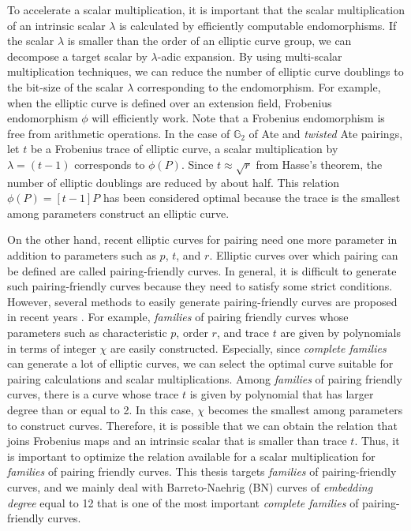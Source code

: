 To accelerate a scalar multiplication, it is important that the scalar multiplication of an intrinsic scalar $\lambda$ is calculated by efficiently computable endomorphisms.
If the scalar $\lambda$ is smaller than the order of an elliptic curve group, we can decompose a target scalar by $\lambda$-adic expansion.
By using multi-scalar multiplication techniques, we can reduce the number of elliptic curve doublings to the bit-size of the scalar $\lambda$ corresponding to the endomorphism.
For example, when the elliptic curve is defined over an extension field, Frobenius endomorphism $\phi$ will efficiently work.
Note that a Frobenius endomorphism is free from arithmetic operations.
In the case of $\mathbb{G}_2$ of Ate and {\it twisted} Ate pairings, let $t$ be a Frobenius trace of elliptic curve, a scalar multiplication by $\lambda = (t-1)$ corresponds to $\phi(P)$.
Since $t\approx\sqrt{r}$ from Hasse's theorem, the number of elliptic doublings are reduced by about half.
This relation $\phi(P)=[t-1]P$ has been considered optimal because the trace is the smallest among parameters construct an elliptic curve. 

On the other hand, recent elliptic curves for pairing need one more parameter in addition to parameters such as $p$, $t$, and $r$.  
Elliptic curves over which pairing can be defined are called pairing-friendly curves.
In general, it is difficult to generate such pairing-friendly curves because they need to satisfy some strict conditions.
However, several methods to easily generate pairing-friendly curves are proposed in recent years \cite{JC:FreScoTes10}.
For example, {\it families} of pairing friendly curves whose parameters such as characteristic $p$, order $r$, and trace $t$ are given by polynomials in terms of integer $\chi$ are easily constructed.
Especially, since {\it complete families} can generate a lot of elliptic curves, we can select the optimal curve suitable for pairing calculations and scalar multiplications.
Among {\it families} of pairing friendly curves, there is a curve whose trace $t$ is given by polynomial that has larger degree than or equal to 2.
In this case, $\chi$ becomes the smallest among parameters to construct curves.
Therefore, it is possible that we can obtain the relation that joins Frobenius maps and an intrinsic scalar that is smaller than trace $t$.
Thus, it is important to optimize the relation available for a scalar multiplication for {\it families} of pairing friendly curves.
This thesis targets {\it families} of pairing-friendly curves, and we mainly deal with Barreto-Naehrig (BN) curves of {\it embedding degree} equal to 12 that is one of the most important {\it complete families} of pairing-friendly curves.

